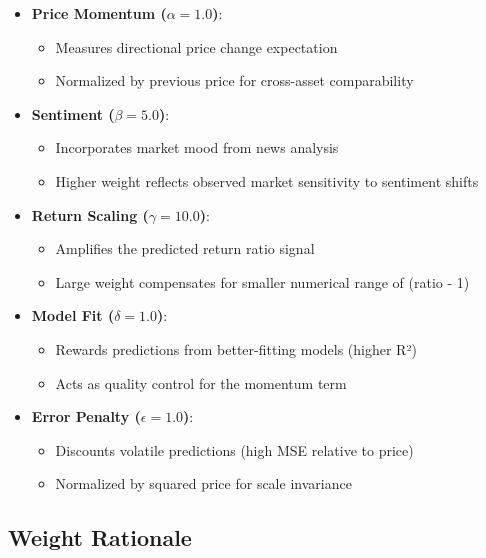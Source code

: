 \documentclass{article}
\begin{document}
	\begin{itemize}[leftmargin=*]
		\item \textbf{Price Momentum ($\alpha=1.0$)}: 
		\begin{itemize}
			\item Measures directional price change expectation
			\item Normalized by previous price for cross-asset comparability
		\end{itemize}
		
		\item \textbf{Sentiment ($\beta=5.0$)}: 
		\begin{itemize}
			\item Incorporates market mood from news analysis
			\item Higher weight reflects observed market sensitivity to sentiment shifts
		\end{itemize}
		
		\item \textbf{Return Scaling ($\gamma=10.0$)}: 
		\begin{itemize}
			\item Amplifies the predicted return ratio signal
			\item Large weight compensates for smaller numerical range of (ratio - 1)
		\end{itemize}
		
		\item \textbf{Model Fit ($\delta=1.0$)}: 
		\begin{itemize}
			\item Rewards predictions from better-fitting models (higher R²)
			\item Acts as quality control for the momentum term
		\end{itemize}
		
		\item \textbf{Error Penalty ($\epsilon=1.0$)}: 
		\begin{itemize}
			\item Discounts volatile predictions (high MSE relative to price)
			\item Normalized by squared price for scale invariance
		\end{itemize}
	\end{itemize}
	
	\subsection{Weight Rationale}
	
\end{document}
